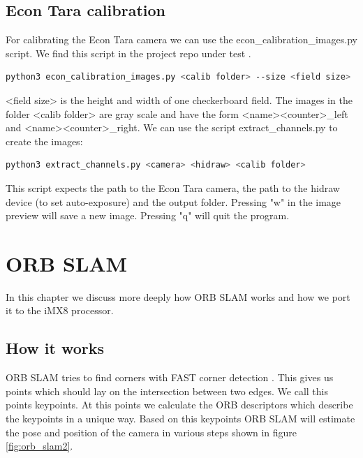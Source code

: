 \documentclass[11pt,a4paper,titlepage,oneside]{report}
\begin{document}
\section{Econ Tara calibration}
For calibrating the Econ Tara camera we can use the econ\_calibration\_images.py script. We find this script in the project repo under test \cite{pa2}.
\begin{lstlisting}[language=bash]
python3 econ_calibration_images.py <calib folder> --size <field size>
\end{lstlisting}

<field size> is the height and width of one checkerboard field. The images in the folder <calib folder> are gray scale and have the form <name><counter>\_left and <name><counter>\_right. We can use the script extract\_channels.py to create the images:
\begin{lstlisting}[language=bash]
python3 extract_channels.py <camera> <hidraw> <calib folder>
\end{lstlisting}
This script expects the path to the Econ Tara camera, the path to the hidraw device (to set auto-exposure) and the output folder. Pressing "w" in the image preview will save a new image. Pressing "q" will quit the program.

\chapter{ORB SLAM}\label{chap:implementation}

In this chapter we discuss more deeply how ORB SLAM works and how we port it to the iMX8 processor.

\section{How it works}
ORB SLAM tries to find corners with FAST corner detection \cite{fast}. This gives us points which should lay on the intersection between two edges. We call this points keypoints. At this points we calculate the ORB descriptors \cite{orb} which describe the keypoints in a unique way. Based on this keypoints ORB SLAM will estimate the pose and position of the camera in various steps shown in figure \ref{fig:orb_slam2}.
\end{document}
